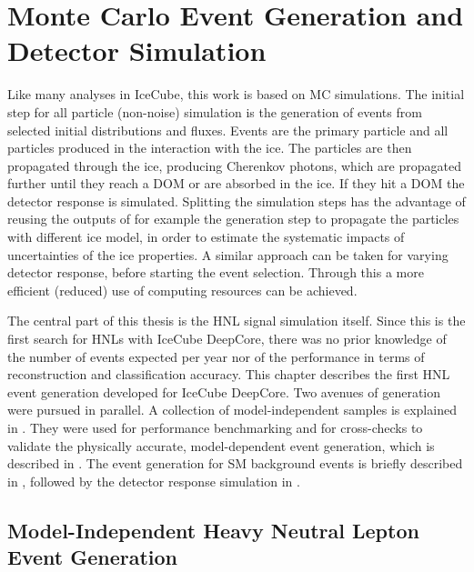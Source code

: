 \setchapterpreamble[u]{\margintoc}

\chapter{Monte Carlo Event Generation and Detector Simulation}

Like many analyses in IceCube, this work is based on MC simulations. The initial step for all particle (non-noise) simulation is the generation of events from selected initial distributions and fluxes. Events are the primary particle and all particles produced in the interaction with the ice. The particles are then propagated through the ice, producing Cherenkov photons, which are propagated further until they reach a DOM or are absorbed in the ice. If they hit a DOM the detector response is simulated. Splitting the simulation steps has the advantage of reusing the outputs of for example the generation step to propagate the particles with different ice model, in order to estimate the systematic impacts of uncertainties of the ice properties. A similar approach can be taken for varying detector response, before starting the event selection. Through this a more efficient (reduced) use of computing resources can be achieved.

The central part of this thesis is the HNL signal simulation itself. Since this is the first search for HNLs with IceCube DeepCore, there was no prior knowledge of the number of events expected per year nor of the performance in terms of reconstruction and classification accuracy. This chapter describes the first HNL event generation developed for IceCube DeepCore. Two avenues of generation were pursued in parallel. A collection of model-independent samples is explained in . They were used for performance benchmarking and for cross-checks to validate the physically accurate, model-dependent event generation, which is described in . The event generation for SM background events is briefly described in , followed by the detector response simulation in .


\section{Model-Independent Heavy Neutral Lepton Event Generation} 


